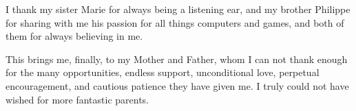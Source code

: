 \documentclass[phd, titlesmallcaps,copyrightpage,foronline,oneside]{SNSthesis}
\def\Include#1{%
        \def\ChapterPath{#1/}%
        \def\GraphicsPath{\ChapterPath Images/}%
        }
\begin{document}
I thank my sister Marie for always being a listening ear, and my brother Philippe for sharing with me his passion for all things computers and games, and both of them for always believing in me.

This brings me, finally, to my Mother and Father, whom I can not thank enough for the many opportunities, endless support, unconditional love, perpetual encouragement, and cautious patience they have given me. I truly could not have wished for more fantastic parents. 


\Include{codes}
\backmatter

\printindex
\end{document}
